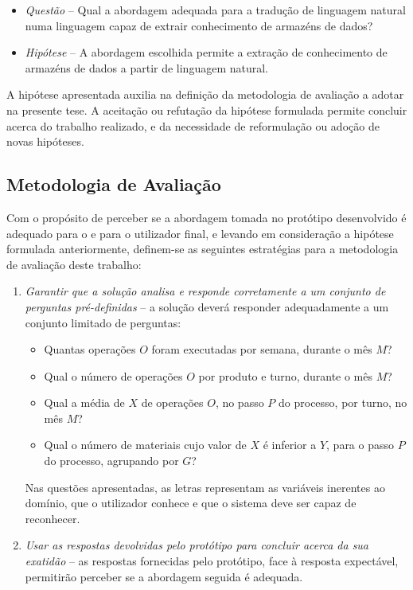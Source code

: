 \begin{itemize}
    \item
    {  
        \textit{Questão} -- Qual a abordagem adequada para a tradução de linguagem natural numa linguagem capaz de extrair conhecimento de armazéns de dados?
    }
    \item
    {
        \textit{Hipótese} -- A abordagem escolhida permite a extração de conhecimento de armazéns de dados a partir de linguagem natural.
    }
\end{itemize}

A hipótese apresentada auxilia na definição da metodologia de avaliação a adotar na presente tese. A aceitação ou refutação da hipótese formulada permite concluir acerca do trabalho realizado, e da necessidade de reformulação ou adoção de novas hipóteses.

\subsection{Metodologia de Avaliação}
\label{sec:chap01_evaluationmethodologies}
Com o propósito de perceber se a abordagem tomada no protótipo desenvolvido é adequado para o {\productname} e para o utilizador final, e levando em consideração a hipótese formulada anteriormente, definem-se as seguintes estratégias para a metodologia de avaliação deste trabalho:

\begin{enumerate}
\label{enum:chap01_qualitystrategies}
    \item 
    {
        \textit{Garantir que a solução analisa e responde corretamente a um conjunto de perguntas pré-definidas} -- a solução deverá responder adequadamente a um conjunto limitado de perguntas:
        \begin{itemize}
            \item 
            {
                Quantas operações $O$ foram executadas por semana, durante o mês $M$?
            }
            \item
            {
                Qual o número de operações $O$ por produto e turno, durante o mês $M$?
            }
            \item
            {
                Qual a média de $X$ de operações $O$, no passo $P$ do processo, por turno, no mês $M$? 
            }
            \item
            {
                Qual o número de materiais cujo valor de $X$ é inferior a $Y$, para o passo $P$ do processo, agrupando por $G$?
            }
        \end{itemize}
        
        Nas questões apresentadas, as letras representam as variáveis inerentes ao domínio, que o utilizador conhece e que o sistema deve ser capaz de reconhecer.
    }
    \item
    {
        \textit{Usar as respostas devolvidas pelo protótipo para concluir acerca da sua exatidão} -- as respostas fornecidas pelo protótipo, face à resposta expectável, permitirão perceber se a abordagem seguida é adequada.
    }
\end{enumerate}

